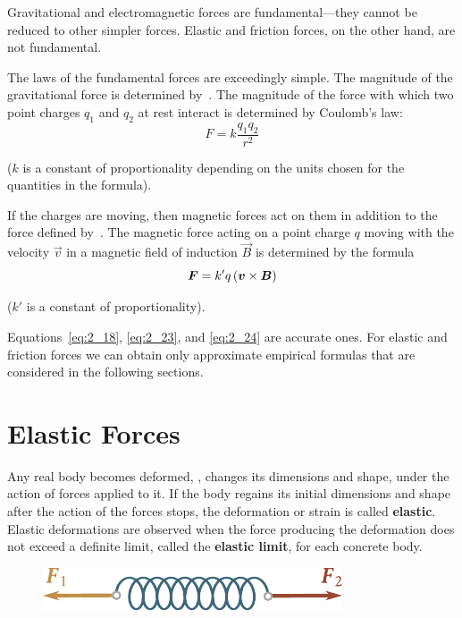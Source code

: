 Gravitational and electromagnetic forces are fundamental---they cannot be reduced to other simpler forces. Elastic and friction forces, on the other hand, are not fundamental.

The laws of the fundamental forces are exceedingly simple. The magnitude of the gravitational force is determined by~. The magnitude of the force with which two point charges $q_1$ and $q_2$ at rest interact is determined by Coulomb's law:
\vspace{-12pt}
\begin{equation}\label{eq:2_23}
F = k\frac{q_1q_2}{r^2}
\end{equation}

\noindent
($k$ is a constant of proportionality depending on the units chosen for the quantities in the formula).

If the charges are moving, then magnetic forces act on them in addition to the force defined by~. The magnetic force acting on a point charge $q$ moving with the velocity $\vec{v}$ in a magnetic field of induction $\vec{B}$ is determined by the formula
\begin{equation}\label{eq:2_24}
\boldsymbol{F} = k'q\,(\boldsymbol{v}\times\boldsymbol{B})
\end{equation}

\noindent
($k'$ is a constant of proportionality).

Equations~\eqref{eq:2_18}, \eqref{eq:2_23}, and \eqref{eq:2_24} are accurate ones. For elastic and friction forces we can obtain only approximate empirical formulas that are considered in the following sections.

\section{Elastic Forces}\label{sec:2_9}

Any real body becomes deformed, \ie, changes its dimensions and shape, under the action of forces applied to it. If the body regains its initial dimensions and shape after the action of the forces stops, the deformation or strain is called \textbf{elastic}. Elastic deformations are observed when the force producing the deformation does not exceed a definite limit, called the \textbf{elastic limit}, for each concrete body.

\begin{figure}[t]
	\begin{center}
		\includegraphics[scale=1]{figures/ch_02/fig_2_4.pdf}
		\caption[]{}
		\label{fig:2_4}
	\end{center}
	\vspace{-0.8cm}
\end{figure}


